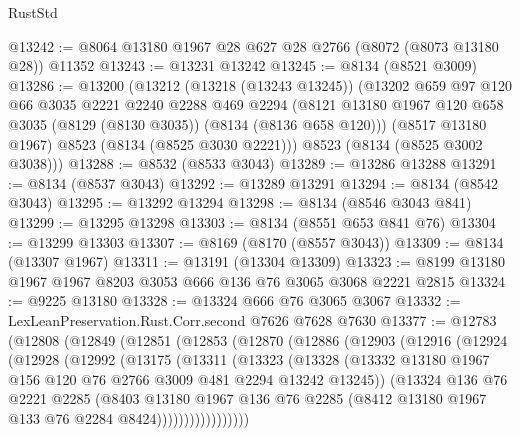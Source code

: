 \begin{lexlean}{RustStd}
\begin{coremodule}
@13242 := @8064 @13180 @1967 @28 @627 @28 @2766 (@8072 (@8073 @13180 @28)) @11352
@13243 := @13231 @13242
@13245 := @8134 (@8521 @3009)
@13286 := @13200
    (@13212
      (@13218 (@13243 @13245))
      (@13202
        @659
        @97
        @120
        @66
        @3035
        @2221
        @2240
        @2288
        @469
        @2294
        (@8121 @13180 @1967 @120 @658 @3035 (@8129 (@8130 @3035)) (@8134 (@8136 @658 @120)))
        (@8517 @13180 @1967)
        @8523
        (@8134 (@8525 @3030 @2221)))
      @8523
      (@8134 (@8525 @3002 @3038)))
@13288 := @8532 (@8533 @3043)
@13289 := @13286 @13288
@13291 := @8134 (@8537 @3043)
@13292 := @13289 @13291
@13294 := @8134 (@8542 @3043)
@13295 := @13292 @13294
@13298 := @8134 (@8546 @3043 @841)
@13299 := @13295 @13298
@13303 := @8134 (@8551 @653 @841 @76)
@13304 := @13299 @13303
@13307 := @8169 (@8170 (@8557 @3043))
@13309 := @8134 (@13307 @1967)
@13311 := @13191 (@13304 @13309)
@13323 := @8199 @13180 @1967 @1967 @8203 @3053 @666 @136 @76 @3065 @3068 @2221 @2815
@13324 := @9225 @13180
@13328 := @13324 @666 @76 @3065 @3067
@13332 := LexLeanPreservation.Rust.Corr.second @7626 @7628 @7630
@13377 := @12783
    (@12808
      (@12849
        (@12851
          (@12853
            (@12870
              (@12886
                (@12903
                  (@12916
                    (@12924
                      (@12928
                        (@12992
                          (@13175
                            (@13311
                              (@13323
                                (@13328
                                  (@13332
                                    @13180
                                    @1967
                                    @156
                                    @120
                                    @76
                                    @2766
                                    @3009
                                    @481
                                    @2294
                                    @13242
                                    @13245))
                                (@13324
                                  @136
                                  @76
                                  @2221
                                  @2285
                                  (@8403
                                    @13180
                                    @1967
                                    @136
                                    @76
                                    @2285
                                    (@8412 @13180 @1967 @133 @76 @2284 @8424)))))))))))))))))

\end{coremodule}
\end{lexlean}
